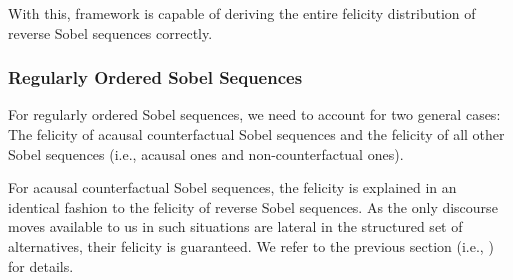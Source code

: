 With this,  framework is capable of deriving the entire felicity distribution of reverse Sobel sequences correctly.

\subsubsection{Regularly Ordered Sobel Sequences}
For regularly ordered Sobel sequences, we need to account for two general cases: The felicity of acausal counterfactual Sobel sequences and the felicity of all other Sobel sequences (i.e., acausal ones and non-counterfactual ones).

For acausal counterfactual Sobel sequences, the felicity is explained in an identical fashion to the felicity of reverse Sobel sequences. As the only discourse moves available to us in such situations are lateral in the structured set of alternatives, their felicity is guaranteed. We refer to the previous section (i.e., ) for details.

